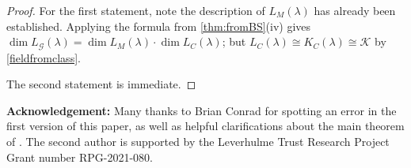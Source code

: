 \documentclass[11pt,reqno]{amsart}
\theoremstyle{definition}
\theoremstyle{remark}
\theoremstyle{definition}
\theoremstyle{plain}
\newcommand{\GG}{\mathcal{G}}
\newcommand{\KK}{\mathcal{K}}
\begin{document}
\begin{proof}
For the first statement, note the description of $L_M(\lambda)$ has already been established. Applying the formula from \cref{thm:fromBS}(iv) gives $\dim L_\GG(\lambda)=\dim L_M(\lambda)\cdot \dim L_C(\lambda)$; but $L_C(\lambda)\cong K_C(\lambda)\cong \KK$ by \cref{fieldfromclass}.

The second statement is immediate.
\end{proof}

{\bf{Acknowledgement:}} Many thanks to Brian Conrad for spotting an error in the first version of this paper, as well as helpful clarifications about the main theorem of \cite{CPClass}. The second author is supported by the Leverhulme Trust Research Project Grant number RPG-2021-080. 

{\footnotesize

}
\end{document}
